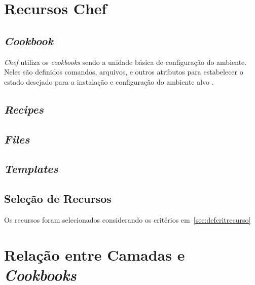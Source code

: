 \section{Recursos Chef}

\label{sec:lev-rec}
\subsection{\textit{Cookbook}}

\textit{Chef} utiliza os \textit{cookbooks} sendo a unidade básica de configuração do
ambiente. Neles são definidos comandos, arquivos, e outros atributos
para estabelecer o estado desejado para a instalação e configuração
do ambiente alvo \cite{sharma:2015}.

\subsection{\textit{Recipes}}
\subsection{\textit{Files}}
\subsection{\textit{Templates}}

\subsection{Seleção de Recursos}
Os recursos foram selecionados considerando os critérios em~\ref{sec:defcritrecurso}

\section{Relação entre Camadas e \textit{Cookbooks}}


